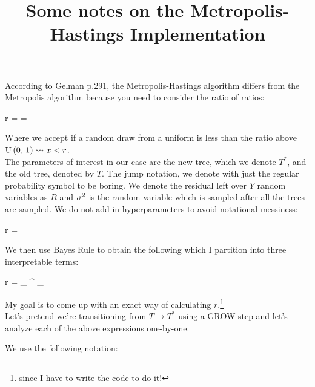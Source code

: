

\title{Some notes on the Metropolis-Hastings Implementation}

\date{}


\maketitle

According to Gelman p.291, the Metropolis-Hastings algorithm differs from the Metropolis algorithm because you need to consider the ratio of ratios:

\beqn
r =  = 
\eeqn

Where we accept if a random draw from a uniform is less than the ratio above \ie $\mathrm{U}\left(0,\,1\right) \leadsto x < r$. \\

The parameters of interest in our case are the new tree, which we denote $T^*$, and the old tree, denoted by $T$. The jump notation, we denote with just the regular probability symbol to be boring. We denote the residual left over $Y$ random variables as $R$ and $\sigma^2$ is the random variable which is sampled after all the trees are sampled. We do not add in hyperparameters to avoid notational messiness:

\beqn
r =  
\eeqn

We then use Bayes Rule to obtain the following which I partition into three interpretable terms:

\beqn
r = _{} \times {}^{} \times {}_{}
\eeqn

My goal is to come up with an exact way of calculating $r$.\footnote{since I have to write the code to do it!} \\

Let's pretend we're transitioning from $T \rightarrow T^*$ using a GROW step and let's analyze each of the above expressions one-by-one. \pagebreak

We use the following notation:


